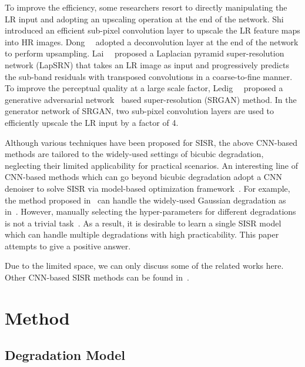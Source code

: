 \documentclass[10pt,twocolumn,letterpaper]{article}
\begin{document}
To improve the efficiency, some researchers resort to directly manipulating the LR input and adopting an upscaling operation at the end of the network.
Shi~\etal~\cite{shi2016real} introduced an efficient sub-pixel convolution layer to upscale the LR feature maps into HR images.
Dong~\etal~\cite{dong2016accelerating} adopted a deconvolution layer at the end of the network to perform upsampling.
Lai~\etal~\cite{lai2017deep} proposed a Laplacian pyramid super-resolution network (LapSRN) that takes an LR image as input and progressively predicts
the sub-band residuals with transposed convolutions in a coarse-to-fine manner.
To improve the perceptual quality at a large scale factor, Ledig~\etal~\cite{ledig2016photo} proposed a generative adversarial network~\cite{goodfellow2014generative} based super-resolution (SRGAN) method.
In the generator network of SRGAN, two sub-pixel convolution layers are used to efficiently upscale the LR input by a factor of 4.

Although various techniques have been proposed for SISR, the above CNN-based methods are tailored to the widely-used settings of bicubic degradation, neglecting their limited applicability for practical scenarios.
An interesting line of CNN-based methods which can go beyond bicubic degradation adopt a CNN denoiser to solve SISR via model-based optimization framework~\cite{zhang2017learning,bigdeli2017deep,meinhardt2017learning}.
For example, the method proposed in~\cite{zhang2017learning} can handle the widely-used Gaussian degradation as in~\cite{dong2013nonlocally}.
However, manually selecting the hyper-parameters for different degradations is not a trivial task~\cite{romano2017little}.
As a result, it is desirable to learn a single SISR model which can handle multiple degradations with high practicability. This paper attempts to give a positive answer.

Due to the limited space, we can only discuss some of the related works here. Other CNN-based SISR methods can be found in~\cite{ren2015shepard,kim2016deeply,yang2017deep,johnson2016perceptual,chen2015learning,tai2017memnet,lim2017enhanced,Timofte2017CVPR,shi2017structure,taiimage,zhang2018residual}.


\section{Method}

\subsection{Degradation Model}
\end{document}
